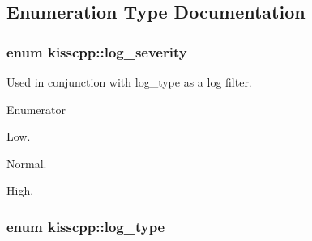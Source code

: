 \subsection{Enumeration Type Documentation}
\hypertarget{namespacekisscpp_a2479a56cdedf21357ca5c68adc699d00}{
\subsubsection[{log\-\_\-severity}]{\setlength{\rightskip}{0pt plus 5cm}enum {\bf kisscpp\-::log\-\_\-severity}}}\label{namespacekisscpp_a2479a56cdedf21357ca5c68adc699d00}


Used in conjunction with log\-\_\-type as a log filter. 

\begin{Desc}
\item[Enumerator]\par
\begin{description}
\item[{\em 
\hypertarget{namespacekisscpp_a2479a56cdedf21357ca5c68adc699d00af0d1f4c43feb2c79cbd2c44cba171b9f}{L\-S\-\_\-\-L\-O\-W}\label{namespacekisscpp_a2479a56cdedf21357ca5c68adc699d00af0d1f4c43feb2c79cbd2c44cba171b9f}
}]Low. \item[{\em 
\hypertarget{namespacekisscpp_a2479a56cdedf21357ca5c68adc699d00aac284c5fe534f527e04da9327a0e484e}{L\-S\-\_\-\-N\-O\-R\-M\-A\-L}\label{namespacekisscpp_a2479a56cdedf21357ca5c68adc699d00aac284c5fe534f527e04da9327a0e484e}
}]Normal. \item[{\em 
\hypertarget{namespacekisscpp_a2479a56cdedf21357ca5c68adc699d00a98a2f9d2011b440e4a890b9c0dbb7bc2}{L\-S\-\_\-\-H\-I\-G\-H}\label{namespacekisscpp_a2479a56cdedf21357ca5c68adc699d00a98a2f9d2011b440e4a890b9c0dbb7bc2}
}]High. \end{description}
\end{Desc}
\hypertarget{namespacekisscpp_a18db16d1f4c281bec16e637c56b0cc88}{
\subsubsection[{log\-\_\-type}]{\setlength{\rightskip}{0pt plus 5cm}enum {\bf kisscpp\-::log\-\_\-type}}}\label{namespacekisscpp_a18db16d1f4c281bec16e637c56b0cc88}


